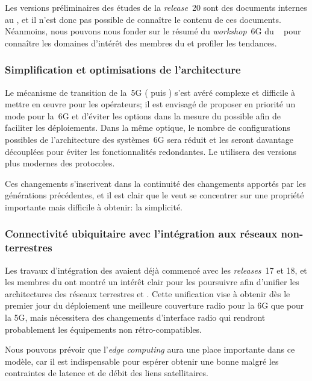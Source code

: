 \documentclass[../main.tex]{subfiles}
\begin{document}
Les versions préliminaires des études de la \textit{release}~20 sont des documents internes au , et il n’est donc pas possible de connaître le contenu de ces documents. Néanmoins, nous pouvons nous fonder sur le résumé du \textit{workshop}~6G du ~\cite{3GPP.WS.2025.6G.SUMMARY} pour connaître les domaines d’intérêt des membres du  et profiler les tendances.

\subsubsection{Simplification et optimisations de l’architecture}
Le mécanisme de transition de la~5G ( puis ) s’est avéré complexe et difficile à mettre en œuvre pour les opérateurs; il est envisagé de proposer en priorité un mode  pour la~6G et d’éviter les options  dans la mesure du possible afin de faciliter les déploiements. Dans la même optique, le nombre de configurations possibles de l’architecture des systèmes~6G sera réduit et les  seront davantage découplées pour éviter les fonctionnalités redondantes. Le  utilisera des versions plus modernes des protocoles.

Ces changements s’inscrivent dans la continuité des changements apportés par les générations précédentes, et il est clair que le  veut se concentrer sur une propriété importante mais difficile à obtenir: la simplicité.

\subsubsection{Connectivité ubiquitaire avec l’intégration aux réseaux non-terrestres}
Les travaux d’intégration des  avaient déjà commencé avec les \textit{releases}~17 et 18, et les membres du  ont montré un intérêt clair pour les poursuivre afin d’unifier les architectures des réseaux terrestres et . Cette unification vise à obtenir dès le premier jour du déploiement une meilleure couverture radio pour la 6G que pour la 5G, mais nécessitera des changements d’interface radio qui rendront probablement les équipements non rétro-compatibles.

Nous pouvons prévoir que l’\textit{edge computing} aura une place importante dans ce modèle, car il est indispensable pour espérer obtenir une bonne  malgré les contraintes de latence et de débit des liens satellitaires.  
\end{document}

